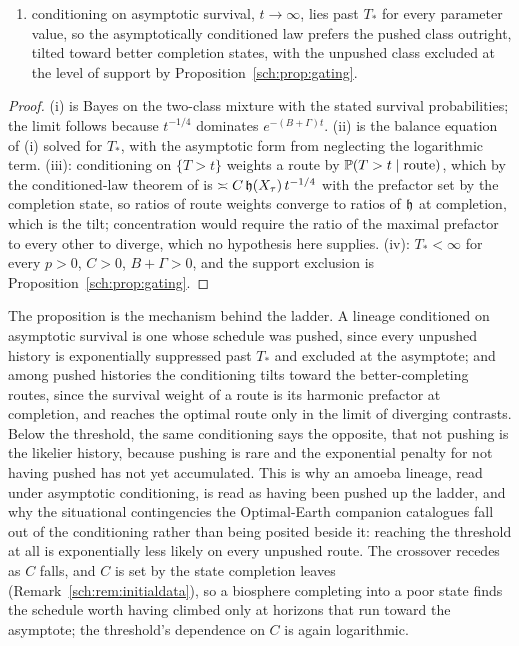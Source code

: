 \begin{remark}
\begin{proposition}
\begin{enumerate}[label=\emph{(\roman*)},itemsep=2pt]
weights in that ratio, and concentration on the route maximizing
\eqref{sch:eq:action}, the optimal route, follows only in a further
limit in which the prefactor contrasts diverge, entered as
\textbf{[S]};
\item conditioning on asymptotic survival, $t\to\infty$, lies past
$T_\ast$ for every parameter value, so the asymptotically conditioned
law prefers the pushed class outright, tilted toward better completion
states, with the unpushed class excluded at the level of support by
Proposition~\ref{sch:prop:gating}.
\end{enumerate}
\end{proposition}

\begin{proof}
(i) is Bayes on the two-class mixture with the stated survival
probabilities; the limit follows because $t^{-1/4}$ dominates
$e^{-(B+\Gamma)t}$. (ii) is the balance equation of (i) solved for
$T_\ast$, with the asymptotic form from neglecting the logarithmic
term. (iii): conditioning on $\{T>t\}$ weights a route by
$\mathbb{P}(T>t\mid\text{route})$, which by the conditioned-law theorem of \cite{GoldenSurvivorship} is
$\asymp C\,\mathfrak{h}(X_\tau)\,t^{-1/4}$ with the prefactor set by the completion
state, so ratios of route weights converge to ratios of $\mathfrak{h}$ at
completion, which is the tilt; concentration would require the ratio of
the maximal prefactor to every other to diverge, which no hypothesis
here supplies. (iv): $T_\ast<\infty$ for every $p>0$, $C>0$,
$B+\Gamma>0$, and the support exclusion is
Proposition~\ref{sch:prop:gating}.
\end{proof}

The proposition is the mechanism behind the ladder. A lineage
conditioned on asymptotic survival is one whose schedule was pushed,
since every unpushed history is exponentially suppressed past $T_\ast$
and excluded at the asymptote; and among pushed histories the
conditioning tilts toward the better-completing routes, since the
survival weight of a route is its harmonic prefactor at completion,
and reaches the optimal route only in the limit of diverging
contrasts. Below the
threshold, the same conditioning says the opposite, that not pushing is
the likelier history, because pushing is rare and the exponential
penalty for not having pushed has not yet accumulated. This is why an
amoeba lineage, read under asymptotic conditioning, is read as having
been pushed up the ladder, and why the situational contingencies the
Optimal-Earth companion catalogues fall out of the conditioning rather
than being posited beside it: reaching the threshold at all is
exponentially less likely on every unpushed route. The crossover
recedes as $C$ falls, and $C$ is set by the state completion leaves
(Remark~\ref{sch:rem:initialdata}), so a biosphere completing into a
poor state finds the schedule worth having climbed only at horizons
that run toward the asymptote; the threshold's dependence on $C$ is
again logarithmic.


\end{remark}
